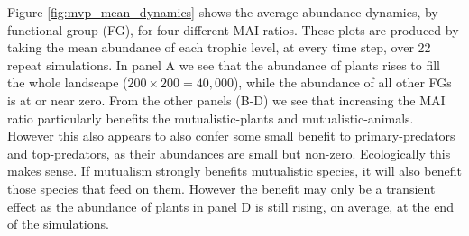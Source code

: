 
Figure \ref{fig:mvp_mean_dynamics} shows the average abundance dynamics, by functional group (FG), for four different MAI ratios. These plots are produced by taking the mean abundance of each trophic level, at every time step, over 22 repeat simulations. In panel A we see that the abundance of plants rises to fill the whole landscape ($200 \times 200=40,000$), while the abundance of all other FGs is at or near zero. From the other panels (B-D) we see that increasing the MAI ratio particularly benefits the mutualistic-plants and mutualistic-animals. However this also appears to also confer some small benefit to primary-predators and top-predators, as their abundances are small but non-zero. Ecologically this makes sense. If mutualism strongly benefits mutualistic species, it will also benefit those species that feed on them. However the benefit may only be a transient effect as the abundance of plants in panel D is still rising, on average, at the end of the simulations. 




